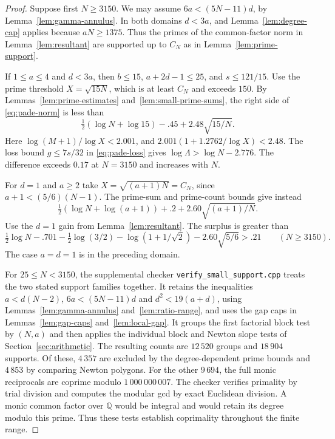 \begin{proof}
Suppose first \(N\ge3150\). We may assume
\(6a<(5N-11)d\), by Lemma~\ref{lem:gamma-annulus}. In both
domains \(d<3a\), and Lemma~\ref{lem:degree-cap} applies
because \(aN\ge1375\). Thus the primes of the common-factor
norm in Lemma~\ref{lem:resultant} are supported up to \(C_N\)
as in Lemma~\ref{lem:prime-support}.

If \(1\le a\le4\) and \(d<3a\), then \(b\le15\),
\(a+2d-1\le25\), and \(s\le121/15\). Use the prime threshold
\(X=\sqrt{15N}\), which is at least \(C_N\) and exceeds \(150\).
By Lemmas~\ref{lem:prime-estimates} and~\ref{lem:small-prime-sums},
the right side of \eqref{eq:pade-norm} is less than
\[
 \tfrac12(\log N+\log 15)-.45+2.48\sqrt{15/N}.
\]
Here \(\log(M+1)/\log X<2.001\), and
\(2.001(1+1.2762/\log X)<2.48\).
The loss bound \(g\le7s/32\) in \eqref{eq:pade-loss} gives
\(\log\Lambda>\log N-2.776\).
The difference exceeds \(0.17\) at \(N=3150\) and increases
with \(N\).

For \(d=1\) and \(a\ge2\) take \(X=\sqrt{(a+1)N}=C_N\),
since \(a+1<(5/6)(N-1)\). The prime-sum and prime-count
bounds give instead
\[
 \tfrac12(\log N+\log(a+1))+.2+2.60\sqrt{(a+1)/N}.
\]
Use the \(d=1\) gain from Lemma~\ref{lem:resultant}.
The surplus is greater than
\[
 \tfrac12\log N-.701-\tfrac12\log(3/2)
       -\log(1+1/\sqrt2)-2.60\sqrt{5/6}>.21
 \qquad(N\ge3150).
\]
The case \(a=d=1\) is in the preceding domain.

For \(25\le N<3150\), the supplemental checker
\texttt{verify\_small\_support.cpp} treats the two stated
support families together. It retains the inequalities
\(a<d(N-2)\), \(6a<(5N-11)d\) and \(d^2<19(a+d)\), using
Lemmas~\ref{lem:gamma-annulus} and~\ref{lem:ratio-range},
and uses the gap caps in Lemmas~\ref{lem:gap-caps}
and~\ref{lem:local-gap}. It groups the first factorial block
test by \((N,a)\) and then applies the individual block and
Newton slope tests of Section~\ref{sec:arithmetic}.
The resulting counts are \(12\,520\) groups and \(18\,904\)
supports. Of these, \(4\,357\) are excluded by the degree-dependent
prime bounds and \(4\,853\) by comparing Newton polygons.
For the other \(9\,694\), the full monic reciprocals are coprime
modulo \(1\,000\,000\,007\). The checker verifies primality by
trial division and computes the modular gcd by exact Euclidean
division. A monic common factor over \(\mathbb Q\) would be
integral and would retain its degree modulo this prime.
Thus these tests establish coprimality throughout the finite range.
\end{proof}

